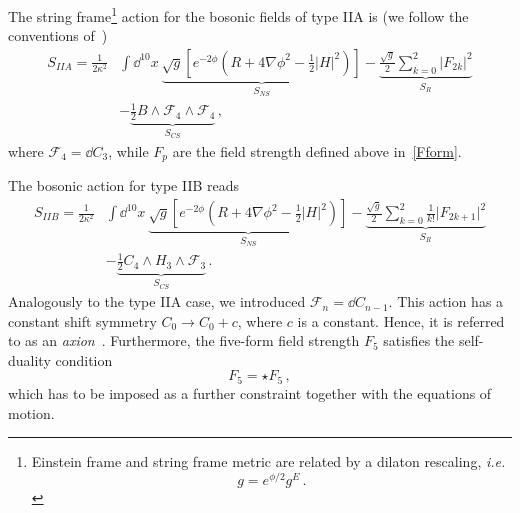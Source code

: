 \documentclass[debug]{phd}
\begin{document}
				 The string frame\footnote{%
				 	Einstein frame and string frame metric are related by a dilaton rescaling, \emph{i.e.}
							\begin{equation*}
								g = e^{\phi/2} g^E \, .
							\end{equation*}
					} action for the bosonic fields of type IIA is (we follow the conventions of~\cite{DemSugra}) 
						\begin{equation*}
							\begin{split}
								S_{IIA} = \frac{1}{2\kappa^2}& \int \dd^{10} x \ \underbrace{\sqrt{g} \left[ e^{-2\phi} \left(R + 4 \nabla \phi ^2 - \frac{1}{2} \lvert H \rvert^2 \right)\right]}_{S_{NS}} - \underbrace{\frac{\sqrt{g}}{2} \sum_{k=0}^2 \lvert F_{2k} \rvert^2}_{S_{R}} \\
								&- \underbrace{\frac{1}{2} B \wedge \mathcal{F}_4 \wedge \mathcal{F}_4}_{S_{CS}} \, ,
							\end{split}		
						\end{equation*}
				 where $\mathcal{F}_4 = \dd C_3$, while $F_p$ are the field strength defined above in~\eqref{Fform}.

				The bosonic action for type IIB reads 
						\begin{equation*}
							\begin{split}
							S_{IIB} = \frac{1}{2\kappa^2}& \int \dd^{10} x \ \underbrace{\sqrt{g} \left[ e^{-2\phi} \left(R + 4 \nabla \phi ^2 - \frac{1}{2} \lvert H \rvert^2 \right)\right]}_{S_{NS}} - \underbrace{\frac{\sqrt{g}}{2} \sum_{k=0}^2 \frac{1}{k!}\lvert F_{2k+1} \rvert^2}_{S_{R}} \\
															& - \underbrace{\frac{1}{2} C_4 \wedge H_3 \wedge \mathcal{F}_3}_{S_{CS}} \, .
							\end{split}							
						\end{equation*}
				Analogously to the type IIA case, we introduced $\mathcal{F}_n = \dd C_{n-1}$.
				This action has a constant shift symmetry $C_0 \rightarrow C_0 + c$, where $c$ is a constant. 
				Hence, it is referred to as an \emph{axion}~\cite{BeckerBeckerSchw, Weinberg:1977ma}.
				Furthermore, the five-form field strength $F_5$ satisfies the self-duality condition
						\begin{equation}\label{F5dual}
							F_5 = \star F_5 \, ,
						\end{equation}
				which has to be imposed as a further constraint together with the equations of motion.
				
\end{document}

